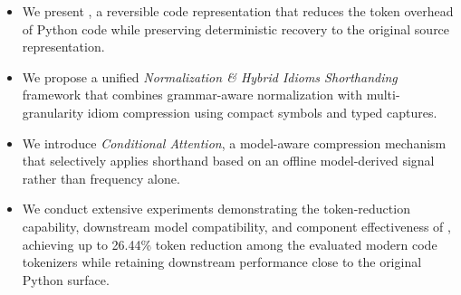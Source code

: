 \begin{itemize}[leftmargin=*]
    \item We present \tool, a reversible code representation that reduces the token overhead of Python code while preserving deterministic recovery to the original source representation.
    \item We propose a unified \textit{Normalization \& Hybrid Idioms Shorthanding} framework that combines grammar-aware normalization with multi-granularity idiom compression using compact symbols and typed captures.
    \item We introduce \textit{Conditional Attention}, a model-aware compression mechanism that selectively applies shorthand based on an offline model-derived signal rather than frequency alone.
    \item We conduct extensive experiments demonstrating the token-reduction capability, downstream model compatibility, and component effectiveness of \tool, achieving up to 26.44\% token reduction among the evaluated modern code tokenizers while retaining downstream performance close to the original Python surface.
\end{itemize}
